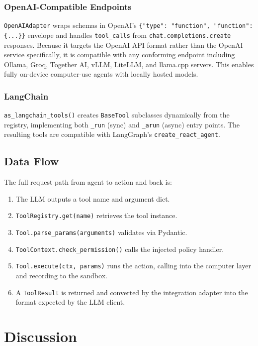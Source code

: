 \documentclass[11pt]{article}
\begin{document}
\subsubsection{OpenAI-Compatible Endpoints}

\texttt{OpenAIAdapter} wraps schemas in OpenAI's \texttt{\{"type": "function", "function": \{...\}\}} envelope and handles \texttt{tool\_calls} from \texttt{chat.completions.create} responses. Because it targets the OpenAI API format rather than the OpenAI service specifically, it is compatible with any conforming endpoint including Ollama, Groq, Together AI, vLLM, LiteLLM, and llama.cpp servers. This enables fully on-device computer-use agents with locally hosted models.

\subsubsection{LangChain}

\texttt{as\_langchain\_tools()} creates \texttt{BaseTool} subclasses dynamically from the registry, implementing both \texttt{\_run} (sync) and \texttt{\_arun} (async) entry points. The resulting tools are compatible with LangGraph's \texttt{create\_react\_agent}.

\subsection{Data Flow}

The full request path from agent to action and back is:

\begin{enumerate}
    \item The LLM outputs a tool name and argument dict.
    \item \texttt{ToolRegistry.get(name)} retrieves the tool instance.
    \item \texttt{Tool.parse\_params(arguments)} validates via Pydantic.
    \item \texttt{ToolContext.check\_permission()} calls the injected policy handler.
    \item \texttt{Tool.execute(ctx, params)} runs the action, calling into the computer layer and recording to the sandbox.
    \item A \texttt{ToolResult} is returned and converted by the integration adapter into the format expected by the LLM client.
\end{enumerate}

\section{Discussion}
\end{document}
